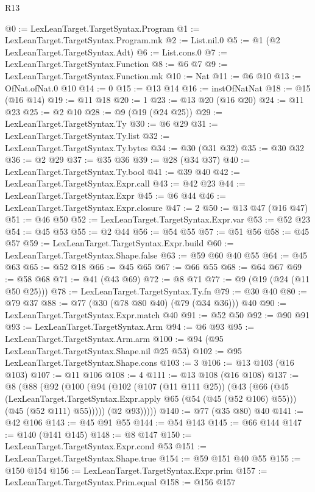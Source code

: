 \begin{lexlean}{R13}
\begin{coremodule}
{{{{{{{{{@0 := LexLeanTarget.TargetSyntax.Program
@1 := LexLeanTarget.TargetSyntax.Program.mk
@2 := List.nil.{0}
@5 := @1 (@2 LexLeanTarget.TargetSyntax.Adt)
@6 := List.cons.{0}
@7 := LexLeanTarget.TargetSyntax.Function
@8 := @6 @7
@9 := LexLeanTarget.TargetSyntax.Function.mk
@10 := Nat
@11 := @6 @10
@13 := OfNat.ofNat.{0} @10
@14 := 0
@15 := @13 @14
@16 := instOfNatNat
@18 := @15 (@16 @14)
@19 := @11 @18
@20 := 1
@23 := @13 @20 (@16 @20)
@24 := @11 @23
@25 := @2 @10
@28 := @9 (@19 (@24 @25))
@29 := LexLeanTarget.TargetSyntax.Ty
@30 := @6 @29
@31 := LexLeanTarget.TargetSyntax.Ty.list
@32 := LexLeanTarget.TargetSyntax.Ty.bytes
@34 := @30 (@31 @32)
@35 := @30 @32
@36 := @2 @29
@37 := @35 @36
@39 := @28 (@34 @37)
@40 := LexLeanTarget.TargetSyntax.Ty.bool
@41 := @39 @40
@42 := LexLeanTarget.TargetSyntax.Expr.call
@43 := @42 @23
@44 := LexLeanTarget.TargetSyntax.Expr
@45 := @6 @44
@46 := LexLeanTarget.TargetSyntax.Expr.closure
@47 := 2
@50 := @13 @47 (@16 @47)
@51 := @46 @50
@52 := LexLeanTarget.TargetSyntax.Expr.var
@53 := @52 @23
@54 := @45 @53
@55 := @2 @44
@56 := @54 @55
@57 := @51 @56
@58 := @45 @57
@59 := LexLeanTarget.TargetSyntax.Expr.build
@60 := LexLeanTarget.TargetSyntax.Shape.false
@63 := @59 @60 @40 @55
@64 := @45 @63
@65 := @52 @18
@66 := @45 @65
@67 := @66 @55
@68 := @64 @67
@69 := @58 @68
@71 := @41 (@43 @69)
@72 := @8 @71
@77 := @9 (@19 (@24 (@11 @50 @25)))
@78 := LexLeanTarget.TargetSyntax.Ty.fn
@79 := @30 @40
@80 := @79 @37
@88 := @77 (@30 (@78 @80 @40) (@79 (@34 @36))) @40
@90 := LexLeanTarget.TargetSyntax.Expr.match @40
@91 := @52 @50
@92 := @90 @91
@93 := LexLeanTarget.TargetSyntax.Arm
@94 := @6 @93
@95 := LexLeanTarget.TargetSyntax.Arm.arm
@100 := @94 (@95 LexLeanTarget.TargetSyntax.Shape.nil @25 @53)
@102 := @95 LexLeanTarget.TargetSyntax.Shape.cons
@103 := 3
@106 := @13 @103 (@16 @103)
@107 := @11 @106
@108 := 4
@111 := @13 @108 (@16 @108)
@137 := @8
    (@88
      (@92
        (@100
          (@94
            (@102
              (@107 (@11 @111 @25))
              (@43
                (@66
                  (@45
                    (LexLeanTarget.TargetSyntax.Expr.apply @65 (@54 (@45 (@52 @106) @55)))
                    (@45 (@52 @111) @55)))))
            (@2 @93)))))
@140 := @77 (@35 @80) @40
@141 := @42 @106
@143 := @45 @91 @55
@144 := @54 @143
@145 := @66 @144
@147 := @140 (@141 @145)
@148 := @8 @147
@150 := LexLeanTarget.TargetSyntax.Expr.cond @53
@151 := LexLeanTarget.TargetSyntax.Shape.true
@154 := @59 @151 @40 @55
@155 := @150 @154
@156 := LexLeanTarget.TargetSyntax.Expr.prim
@157 := LexLeanTarget.TargetSyntax.Prim.equal
@158 := @156 @157
}}}}}}}}}
\end{coremodule}
\end{lexlean}
